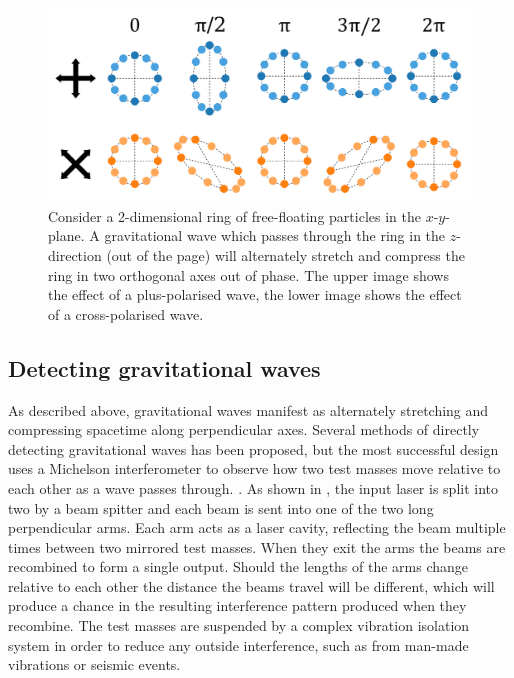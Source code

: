 \begin{colsection}
\begin{colsection}
\begin{figure}[t]
    \begin{center}
        \includegraphics[width=0.8\linewidth]{images/waveimg2.pdf}
    \end{center}
    \caption[Gravitational wave polarisations]{
        Consider a 2-dimensional ring of free-floating particles in the $x$-$y$-plane. A gravitational wave which passes through the ring in the $z$-direction (out of the page) will alternately stretch and compress the ring in two orthogonal axes out of phase. The upper image shows the effect of a plus-polarised wave, the lower image shows the effect of a cross-polarised wave.
        }\label{fig:wave}
\end{figure}

\end{colsection}

\newpage
\subsection{Detecting gravitational waves}
\label{sec:gw_detecting}
\begin{colsection}

As described above, gravitational waves manifest as alternately stretching and compressing spacetime along perpendicular axes. Several methods of directly detecting gravitational waves has been proposed, but the most successful design uses a Michelson interferometer to observe how two test masses move relative to each other as a wave passes through. \citep{BIGbirmingham}. As shown in , the input laser is split into two by a beam spitter and each beam is sent into one of the two long perpendicular arms. Each arm acts as a laser cavity, reflecting the beam multiple times between two mirrored test masses. When they exit the arms the beams are recombined to form a single output. Should the lengths of the arms change relative to each other the distance the beams travel will be different, which will produce a chance in the resulting interference pattern produced when they recombine. The test masses are suspended by a complex vibration isolation system in order to reduce any outside interference, such as from man-made vibrations or seismic events.


\end{colsection}
\end{colsection}
